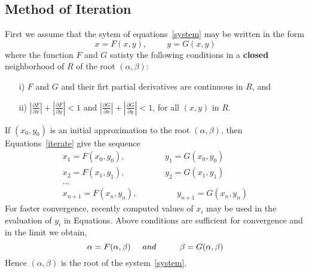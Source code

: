 \documentclass[aima203_lecturenotes_ku.tex]{subfiles}
\begin{document}
\subsection{Method of Iteration}
First we assume that the sytem of equations~\ref{system} may be written in the form
\begin{equation}
  \label{iterate}
  x=F(x,y), \hspace{1cm} y=G(x,y)
\end{equation}
where the function $F$ and $G$ satisty the following conditions in a \textbf{closed} neighborhood of $R$ of the root $(\alpha, \beta)$:
\begin{enumerate}
\item[i)] $F$ and $G$ and their firt partial derivatives are continuous in $R$, and
  \item[ii)] $\displaystyle \left | \frac{\partial F}{\partial x} \right | + \left | \frac{\partial F}{\partial y} \right | < 1$ and $\displaystyle \left | \frac{\partial G}{\partial x} \right | + \left | \frac{\partial G}{\partial y} \right | < 1$, for all $(x,y)$ in $R$.
\end{enumerate}
If $(x_0,y_0)$ is an initial approximation to the root $(\alpha, \beta)$, then Equations~\ref{iterate} give the sequence
\begin{equation}
\begin{gathered}
  x_1 = F(x_0,y_0), \hspace{2cm} y_1 = G(x_0,y_0) \\
  x_2 = F(x_1,y_1), \hspace{2cm} y_2 = G(x_1,y_1) \\
  ... \\
  x_{n+1} = F(x_n,y_n), \hspace{2cm} y_{n+1} = G(x_n,y_n)
\end{gathered}
\end{equation}
For faster convergence, recently computed values of $x_i$ may be used in the evaluation of $y_i$ in Equations. Above conditions are sufficient for convergence and in the limit we obtain,
\begin{equation}
  \alpha = F(\alpha, \beta) \hspace{5mm} and \hspace{1cm} \beta=G(\alpha, \beta)
\end{equation}
Hence $(\alpha, \beta)$ is the root of the system~\ref{system}.
\end{document}
